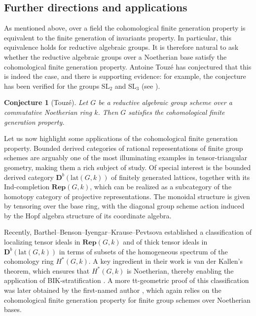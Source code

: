 \documentclass{article}
\theoremstyle{plain}
\newtheorem{conjx}{Conjecture}
\theoremstyle{definition}
\begin{document}
 \subsection*{Further directions and applications}
As mentioned above, over a field the cohomological finite generation property is equivalent to the finite generation of invariants property. In particular, this equivalence holds for reductive algebraic groups. It is therefore natural to ask whether the reductive algebraic groups over a Noetherian base satisfy the cohomological finite generation property. Antoine Touzé has conjectured that this is indeed the case, and there is supporting evidence: for example, the conjecture has been verified for the groups $\mathrm{SL}_2$ and $\mathrm{SL}_3$ (see \cite[Section 4]{AiM}).

\begin{conjx}[Touz\'e]
    Let $G$ be a reductive  algebraic group scheme over a commutative Noetherian ring $k$. Then $G$ satisfies  the cohomological finite generation property.
\end{conjx}

Let us now highlight some applications of the cohomological finite generation property. Bounded derived categories of rational representations of finite group schemes are arguably one of the most illuminating examples in tensor-triangular geometry, making them a rich subject of study. Of special interest is  the bounded derived category $\mathbf{D}^b(\mathrm{lat}(G,k))$ of finitely generated lattices, together with its Ind-completion $\mathbf{Rep}(G,k)$, which can be realized as a subcategory of the homotopy category of projective representations. The monoidal structure is given by tensoring over the base ring, with the diagonal group scheme action induced by the Hopf algebra structure of its coordinate algebra.

Recently, Barthel–Benson–Iyengar–Krause–Pevtsova \cite{BBIKP} established a classification of localizing tensor ideals in $\mathbf{Rep}(G,k)$ and of thick tensor ideals in $\mathbf{D}^b(\mathrm{lat}(G,k))$ in terms of subsets of the homogeneous spectrum of the cohomology ring $H^\ast(G,k)$. A key ingredient in their work is van der Kallen’s theorem, which ensures that $H^\ast(G,k)$ is Noetherian, thereby enabling the application of BIK-stratification \cite{BIK11}. A more tt-geometric proof of this classification was later obtained by the first-named author \cite{Gom25}, which again relies on the cohomological finite generation property for finite group schemes over Noetherian bases.
\end{document}

